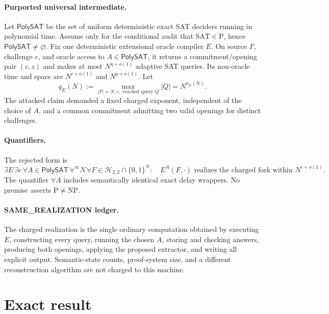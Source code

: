 \documentclass[11pt]{article}
\newcommand{\SAT}{\mathrm{SAT}}
\newcommand{\Hcore}{\mathcal H_{2,2}}
\begin{document}
\paragraph{Purported universal intermediate.}
Let $\mathsf{PolySAT}$ be the set of uniform deterministic exact SAT
deciders running in polynomial time.  Assume only for the conditional audit
that $\SAT\in\mathrm P$, hence $\mathsf{PolySAT}\ne\varnothing$.
Fix one deterministic extensional oracle compiler $E$.  On source $F$,
challenge $e$, and oracle access to $A\in\mathsf{PolySAT}$, it returns a
commitment/opening pair $(c,z)$ and makes at most
$N^{\eta+o(1)}$ adaptive SAT queries.  Its non-oracle time and space are
$N^{r+o(1)}$ and $N^{p+o(1)}$.  Let
\[
 q_E(N):=\max_{|F|=N,e,\text{ reached query }Q}|Q|=N^{\sigma_E(N)}.
\]
The attacked claim demanded a fixed charged exponent, independent of the
choice of $A$, and a common commitment admitting two valid openings for
distinct challenges.

\paragraph{Quantifiers.}
The rejected form is
\[
 \exists E\,\exists c\,\forall A\in\mathsf{PolySAT}\,
 \forall^{\infty}N\,\forall F\in\Hcore\cap\{0,1\}^{N}:
 \quad E^A(F,\cdot)\text{ realizes the charged fork within }N^{c+o(1)}.
\]
The quantifier $\forall A$ includes semantically identical exact delay
wrappers.  No premise asserts $\mathrm P\ne\mathrm{NP}$.

\paragraph{SAME\_REALIZATION ledger.}
The charged realization is the single ordinary computation obtained by
executing $E$, constructing every query, running the chosen $A$, storing and
checking answers, producing both openings, applying the proposed extractor,
and writing all explicit output.  Semantic-state counts, proof-system size,
and a different reconstruction algorithm are not charged to this machine.

\section{Exact result}
\end{document}
